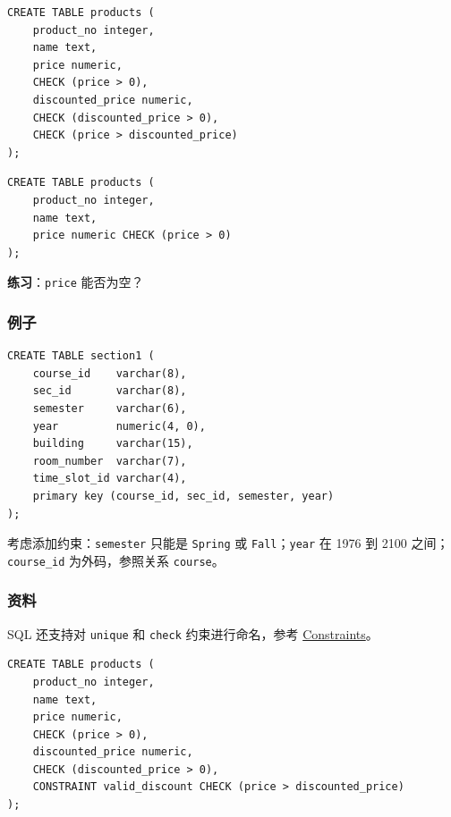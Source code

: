 \documentclass[aspectratio=169, 14pt]{beamer}
\begin{document}
\begin{frame}[fragile]

    \begin{verbatim}
CREATE TABLE products (
    product_no integer,
    name text,
    price numeric,
    CHECK (price > 0),
    discounted_price numeric,
    CHECK (discounted_price > 0),
    CHECK (price > discounted_price)
);
    \end{verbatim}
\end{frame}

\begin{frame}[fragile]
    \begin{verbatim}
CREATE TABLE products (
    product_no integer,
    name text,
    price numeric CHECK (price > 0)
);
    \end{verbatim}
    {\large {}}  \textbf{练习}：\texttt{price} 能否为空？

\pause


\end{frame}

\begin{frame}[fragile]
    \frametitle{例子}

\begin{verbatim}
CREATE TABLE section1 (
    course_id    varchar(8),
    sec_id       varchar(8),
    semester     varchar(6),
    year         numeric(4, 0),
    building     varchar(15),
    room_number  varchar(7),
    time_slot_id varchar(4),
    primary key (course_id, sec_id, semester, year)
);
\end{verbatim}
    
考虑添加约束：\texttt{semester} 只能是 \texttt{Spring} 或 \texttt{Fall}；\texttt{year} 在 1976 到 2100 之间；\texttt{course\_id} 为外码，参照关系 \texttt{course}。
\end{frame}

\begin{frame}[fragile]
    \frametitle{资料}
SQL 还支持对 \texttt{unique} 和 \texttt{check} 约束进行命名，参考 \href{https://www.postgresql.org/docs/14/ddl-constraints.html}{Constraints}。

\begin{verbatim}
CREATE TABLE products (
    product_no integer,
    name text,
    price numeric,
    CHECK (price > 0),
    discounted_price numeric,
    CHECK (discounted_price > 0),
    CONSTRAINT valid_discount CHECK (price > discounted_price)
);
\end{verbatim}

\end{frame}
\end{document}
